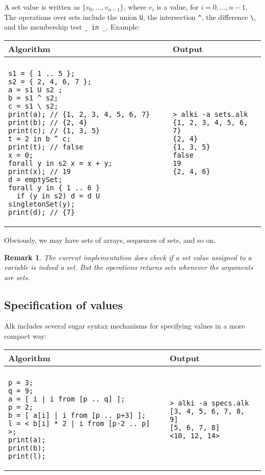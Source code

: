 \documentclass[a4paper]{report}
\newtheorem*{remark}{Remark}
\begin{document}
A set value is written as $\{ v_0,\ldots,v_{n-1}\}$, where $v_i$ is a value, for $i=0,\ldots,n-1$. The operations over sets include the union \verb|U|, the intersection \verb|^|, the difference \verb|\|, and the membership test \verb|_ in _|.
Example:
\begin{center}
\begin{tabular}{ll}
Algorithm & Output\\
\hline
\\
\begin{minipage}{.55\textwidth}
\begin{verbatim}
s1 = { 1 .. 5 };
s2 = { 2, 4, 6, 7 };
a = s1 U s2 ;
b = s1 ^ s2;
c = s1 \ s2;
print(a); // {1, 2, 3, 4, 5, 6, 7}
print(b); // {2, 4}
print(c); // {1, 3, 5}
t = 2 in b ^ c;
print(t); // false
x = 0;
forall y in s2 x = x + y;
print(x); // 19
d = emptySet;
forall y in { 1 .. 6 }
  if (y in s2) d = d U singletonSet(y);
print(d); // {7}
\end{verbatim}
\end{minipage}
&
\begin{minipage}{.45\textwidth}
\begin{verbatim}
> alki -a sets.alk 
{1, 2, 3, 4, 5, 6, 7}
{2, 4}
{1, 3, 5}
false
19
{2, 4, 6}
\end{verbatim}
\end{minipage}
\end{tabular}
\end{center}

Obviously, we may have sets of arrays, sequences of sets, and so on.

\begin{remark}
The current implementation does check if a set value assigned to a variable is indeed a set. But the operations returns sets whenever the arguments are sets.
\end{remark}

\subsection{Specification of values}

Alk includes several sugar syntax mechanisms for specifying values in a more compact way:
\begin{center}
\begin{tabular}{ll}
Algorithm & Output\\
\hline
\\
\begin{minipage}{.45\textwidth}
\begin{verbatim}
p = 3;
q = 9;
a = [ i | i from [p .. q] ];
p = 2;
b = [ a[i] | i from [p .. p+3] ];
l = < b[i] * 2 | i from [p-2 .. p] >;
print(a);
print(b);
print(l);
\end{verbatim}
\end{minipage}
&
\begin{minipage}{.45\textwidth}
\begin{verbatim}
> alki -a specs.alk
[3, 4, 5, 6, 7, 8, 9]
[5, 6, 7, 8]
<10, 12, 14>
\end{verbatim}
\end{minipage}
\end{tabular}
\end{center}
\end{document}
